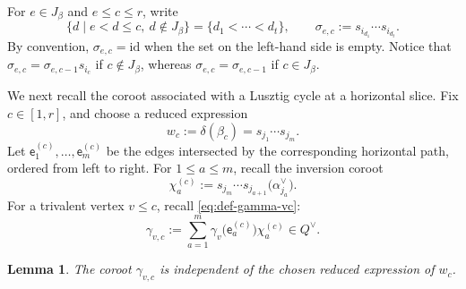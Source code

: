 \documentclass[12pt, reqno]{amsart}
\theoremstyle{plain}
\newtheorem{lemma}[theorem]{Lemma}
\theoremstyle{definition}
\numberwithin{equation}{section}
\begin{document}
For \(e\in J_\beta\) and \(e\leq c\leq r\), write
\begin{equation}
 \bigl\{
 d\mid e<d\leq c,\ d\notin J_\beta
 \bigr\}
 =
 \{d_1<\cdots<d_t\},
 \qquad
 \sigma_{e,c}
 :=
 s_{i_{d_1}}\cdots s_{i_{d_t}}.
 \label{eq:sigma-ec}
\end{equation}
By convention, \(\sigma_{e,c}=\mathrm{id}\) when the set on the
left-hand side is empty. Notice that
\(\sigma_{e,c}=\sigma_{e,c-1}s_{i_c}\) if \(c\notin J_\beta\), whereas
\(\sigma_{e,c}=\sigma_{e,c-1}\) if \(c\in J_\beta\).

We next recall the coroot associated with a Lusztig cycle at a
horizontal slice. Fix \(c\in[1,r]\), and choose a reduced expression
\[
w_c:=\delta(\beta_c)=s_{j_1}\cdots s_{j_m}.
\]
Let \(\mathsf e_1^{(c)},\ldots,\mathsf e_m^{(c)}\) be the edges
intersected by the corresponding horizontal path, ordered from left
to right. For \(1\leq a\leq m\), recall the inversion coroot
\begin{equation}
 \chi_a^{(c)}
 :=
 s_{j_m}\cdots s_{j_{a+1}}
 \bigl(\alpha_{j_a}^{\vee}\bigr).
 \label{eq:inversion-coroot-c}
\end{equation}
For a trivalent vertex \(v\leq c\), recall
\eqref{eq:def-gamma-vc}:
\begin{equation}
 \gamma_{v,c}
 :=
 \sum_{a=1}^{m}
 \gamma_v\bigl(\mathsf e_a^{(c)}\bigr)\chi_a^{(c)}
 \in Q^\vee.
 \label{eq:gamma-vc}
\end{equation}

\begin{lemma}
\label{lem:gamma-vc-well-defined}
The coroot \(\gamma_{v,c}\) is independent of the chosen reduced
expression of \(w_c\).
\end{lemma}
\end{document}
